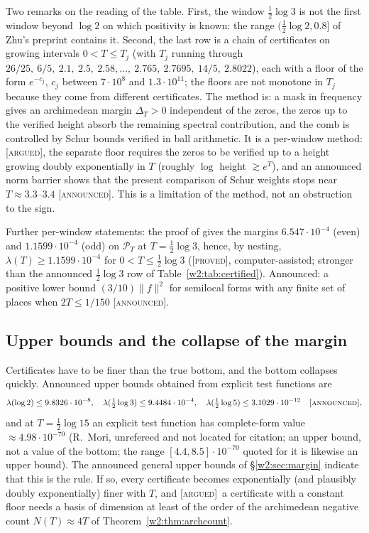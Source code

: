\documentclass[11pt]{amsart}
\theoremstyle{definition}
\theoremstyle{remark}
\numberwithin{equation}{section}
\newcommand{\PT}{\mathcal{P}_T}                        %
\newcommand{\lam}{\lambda(T)}                          %
\newcommand{\stag}[1]{\textsc{[#1]}}
\newcommand{\PROVED}{\stag{proved}}
\newcommand{\ARGUED}{\stag{argued}}
\newcommand{\ANNOUNCED}{\stag{announced}}
\begin{document}
Two remarks on the reading of the table. First, the window $\frac12\log3$ is not the first window beyond $\log2$ on which
positivity is known: the range $(\frac12\log2,0.8]$ of Zhu's preprint \cite{Zhu2026} contains it. Second, the last row is a chain of
certificates on growing intervals $0<T\le T_j$ (with $T_j$ running through $26/25,\ 6/5,\ 2.1,\ 2.5,\ 2.58,\dots,\
2.765,\ 2.7695,\ 14/5,\ 2.8022$), each with a floor of the form $e^{-c_j}$, $c_j$ between $7\cdot10^{8}$ and
$1.3\cdot10^{11}$; the floors are not monotone in $T_j$ because they come from different certificates. The method is:
a mask in frequency gives an archimedean margin $\Delta_T>0$ independent of the zeros, the zeros up to the verified
height absorb the remaining spectral contribution, and the comb is controlled by Schur bounds verified in ball
arithmetic. It is a per-window method: \ARGUED, the separate floor requires the zeros to be verified up to a height
growing doubly exponentially in $T$ (roughly $\log$ height $\gtrsim e^{T}$), and an announced norm barrier shows that the
present comparison of Schur weights stops near $T\approx3.3$--$3.4$ \ANNOUNCED. This is a limitation of the method, not
an obstruction to the sign.

Further per-window statements: the proof of \cite[Theorem~9.18]{P42} gives the margins $6.547\cdot10^{-4}$ (even) and
$1.1599\cdot10^{-4}$ (odd) on $\PT$ at $T=\frac12\log3$, hence, by nesting, $\lam\ge1.1599\cdot10^{-4}$ for
$0<T\le\frac12\log3$ (\PROVED, computer-assisted; stronger than the announced $\frac12\log3$ row of
Table~\ref{w2:tab:certified}). Announced: a positive lower bound $(3/10)\|f\|^2$ for semilocal forms with any finite set of places when
$2T\le1/150$ \ANNOUNCED.

\subsection{Upper bounds and the collapse of the margin}

Certificates have to be finer than the true bottom, and the bottom collapses quickly. Announced upper bounds obtained from
explicit test functions are
\[
\lambda(\log2)\le9.8326\cdot10^{-8},\quad \lambda(\tfrac12\log3)\le9.4484\cdot10^{-4},\quad
\lambda(\tfrac12\log5)\le3.1029\cdot10^{-12}\quad\ANNOUNCED,
\]
and at $T=\frac12\log15$ an explicit test function has complete-form value $\approx4.98\cdot10^{-70}$ (R.~Mori, unrefereed and not located for citation; an upper bound, not a value of the bottom; the range $[4.4,8.5]\cdot10^{-70}$ quoted for it is
likewise an upper bound). The announced general upper bounds of \S\ref{w2:sec:margin} indicate that this is the rule. If so,
every certificate becomes exponentially (and plausibly doubly exponentially) finer with $T$, and \ARGUED\ a
certificate with a constant floor needs a basis of dimension at least of the order of the archimedean negative count
$N(T)\approx4T$ of Theorem~\ref{w2:thm:archcount}.
\end{document}
